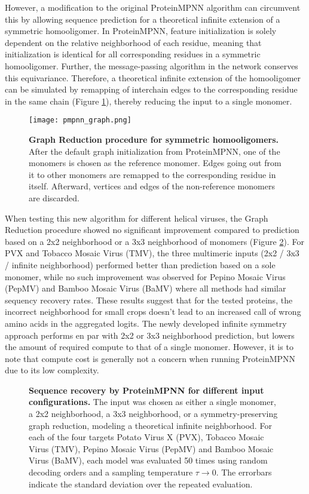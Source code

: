 However, a modification to the original ProteinMPNN algorithm can circumvent this by allowing sequence prediction for a theoretical infinite extension of a symmetric homooligomer. In ProteinMPNN, feature initialization is solely dependent on the relative neighborhood of each residue, meaning that initialization is identical for all corresponding residues in a symmetric homooligomer. Further, the message-passing algorithm in the network conserves this equivariance. Therefore, a theoretical infinite extension of the homooligomer can be simulated by remapping of interchain edges to the corresponding residue in the same chain (Figure \ref{fig:pmpnn_graph}), thereby reducing the input to a single monomer. 

\begin{figure}
\centering
\texttt{[image: pmpnn\_graph.png]}
\caption{\textbf{Graph Reduction procedure for symmetric homooligomers.} After the default graph initialization from ProteinMPNN, one of the monomers is chosen as the reference monomer. Edges going out from it to other monomers are remapped to the corresponding residue in itself. Afterward, vertices and edges of the non-reference monomers are discarded. }
\label{fig:pmpnn_graph}
\end{figure}

When testing this new algorithm for different helical viruses, the Graph Reduction procedure showed no significant improvement compared to prediction based on a 2x2 neighborhood or a 3x3 neighborhood of monomers (Figure \ref{fig:pmpnn_comp}). For PVX and Tobacco Mosaic Virus (TMV), the three multimeric inputs (2x2 / 3x3 / infinite neighborhood) performed better than prediction based on a sole monomer, while no such improvement was observed for Pepino Mosaic Virus (PepMV) and Bamboo Mosaic Virus (BaMV) where all methods had similar sequency recovery rates. These results suggest that for the tested proteins, the incorrect neighborhood for small crops doesn't lead to an increased call of wrong amino acids in the aggregated logits. The newly developed infinite symmetry approach performs en par with 2x2 or 3x3 neighborhood prediction, but lowers the amount of required compute to that of a single monomer. However, it is to note that compute cost is generally not a concern when running ProteinMPNN due to its low complexity. 

\begin{figure}
\centering

\caption{\textbf{Sequence recovery by ProteinMPNN for different input configurations.} The input was chosen as either a single monomer, a 2x2 neighborhood, a 3x3 neighborhood, or a symmetry-preserving graph reduction, modeling a theoretical infinite neighborhood. For each of the four targets Potato Virus X (PVX), Tobacco Mosaic Virus (TMV), Pepino Mosaic Virus (PepMV) and Bamboo Mosaic Virus (BaMV), each model was evaluated 50 times using random decoding orders and a sampling temperature $\tau\rightarrow 0$. The errorbars indicate the standard deviation over the repeated evaluation. }
\label{fig:pmpnn_comp}
\end{figure}

